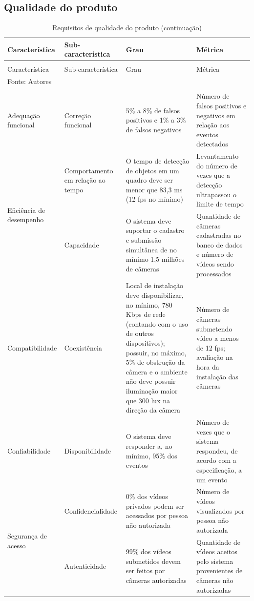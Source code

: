 \documentclass[]{politex}
\begin{document}
\subsection{Qualidade do produto}
\begin{center}
\begin{longtable}{m{3cm} | m{4cm} | m{4cm} | m{4cm}} 
\caption{\label{tab:qualidade_produto}Requisitos de qualidade do produto}\\
\hline\hline
Característica & Sub-característica & Grau & Métrica \\
\hline
\endfirsthead
\caption[]{Requisitos de qualidade do produto (continuação)} \\
\hline
Característica & Sub-característica & Grau & Métrica \\
\hline
\endhead
\hline\hline
\multicolumn{4}{l}{Fonte: Autores} \\
\endlastfoot
\hline
\multicolumn{4}{r}{\footnotesize{}continua na próxima página} \\
\endfoot
 
Adequação funcional & Correção funcional & 5\% a 8\% de falsos positivos e 1\% a 3\% de falsos negativos & Número de falsos positivos e negativos em relação aos eventos detectados\\
\hline

\multirow{2}{3cm}{Eficiência de desempenho} & Comportamento em relação ao tempo & O tempo de detecção de objetos em um quadro deve ser menor que 83,3 ms (12 \acrshort{fps} no mínimo) & Levantamento do número de vezes que a detecção ultrapassou o limite de tempo \\ \cline{2-4}
& Capacidade & O sistema deve suportar o cadastro e submissão simultânea de no mínimo 1,5 milhões de câmeras & Quantidade de câmeras cadastradas no banco de dados e número de vídeos sendo processados \\
\hline

Compatibilidade & Coexistência & Local de instalação deve disponibilizar, no mínimo, 780 Kbps de rede (contando com o uso de outros dispositivos); possuir, no máximo, 5\% de obstrução da câmera e o ambiente não deve possuir iluminação maior que 300 lux na direção da câmera & Número de câmeras submetendo vídeo a menos de 12 \acrshort{fps}; avaliação na hora da instalação das câmeras \\
\hline

Confiabilidade & Disponibilidade & O sistema deve responder a, no mínimo, 95\% dos eventos & Número de vezes que o sistema respondeu, de acordo com a especificação, a um evento \\
\hline

\multirow{2}{3cm}{Segurança de acesso} & Confidencialidade & 0\% dos vídeos privados podem ser acessados por pessoa não autorizada & Número de vídeos visualizados por pessoa não autorizada \\ \cline{2-4}
& Autenticidade & 99\% dos vídeos submetidos devem ser feitos por câmeras autorizadas & Quantidade de vídeos aceitos pelo sistema provenientes de câmeras não autorizadas \\
\end{longtable}
\end{center}
\end{document}
